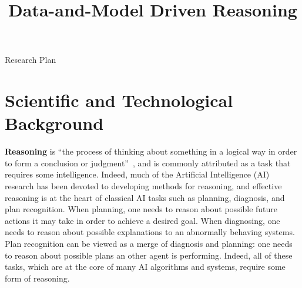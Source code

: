 \documentclass[12pt]{article}
\newcommand{\note}[1]{\textbf{\textit{#1}}}
\begin{document}
\title{Data-and-Model Driven Reasoning}

\begin{center}
\LARGE{Research Plan}
\end{center}

\section{Scientific and Technological Background}

{\bf Reasoning} is ``the process of thinking about something in a logical way in order to form a conclusion or judgment''~\cite{reasoning2016dictionary}, and is commonly attributed as a task that requires some intelligence. Indeed, much of the Artificial Intelligence (AI) research has been devoted to developing methods for reasoning, and effective reasoning is at the heart of classical AI tasks such as planning, diagnosis, and plan recognition. When planning, one needs to reason about possible future actions it may take in order to achieve a desired goal. When diagnosing, one needs to reason about possible explanations to an abnormally behaving systems. Plan recognition can be viewed as a merge of diagnosis and planning: one needs to reason about possible plans an other agent is performing. Indeed, all of these tasks, which are at the core of many AI algorithms and systems, require some form of reasoning.  




\end{document}
